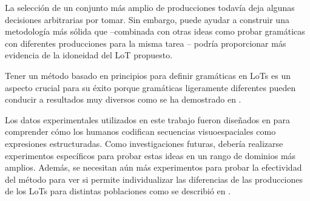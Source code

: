 
La selección de un conjunto más amplio de producciones todavía deja algunas decisiones arbitrarias por tomar. Sin embargo, puede ayudar a construir una metodología más sólida que --combinada con otras ideas como probar gramáticas con diferentes producciones para la misma tarea \cite{piantadosi2016logical}-- podría proporcionar más evidencia de la idoneidad del LoT propuesto.


Tener un método basado en principios para definir gramáticas en LoTs es un aspecto crucial para su éxito porque gramáticas ligeramente diferentes pueden conducir a resultados muy diversos como se ha demostrado en \cite{piantadosi2016logical}.


Los datos experimentales utilizados en este trabajo fueron diseñados en \cite{amalric2017language} para comprender cómo los humanos codifican secuencias visuoespaciales como expresiones estructuradas. Como investigaciones futuras, debería realizarse experimentos específicos para probar estas ideas en un rango de dominios más amplios. Además, se necesitan aún más experimentos para probar la efectividad del método para ver si permite individualizar las diferencias de las producciones de los LoTs para distintas poblaciones como se describió en .


